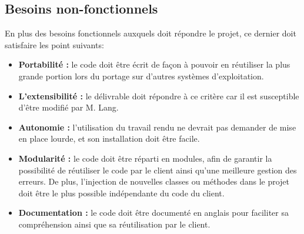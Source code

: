 \subsection{Besoins non-fonctionnels}
En plus des besoins fonctionnels auxquels doit répondre le projet, ce dernier doit satisfaire les point suivants:\\
\begin{itemize}
\item \textbf{Portabilité :} le code doit être écrit de façon à pouvoir en réutiliser la plus grande portion lors du portage sur d'autres systèmes d'exploitation.\\
\item \textbf{L'extensibilité :} le délivrable doit répondre à ce critère car il est susceptible d'être modifié par M. Lang.\\
\item \textbf{Autonomie :} l'utilisation du travail rendu ne devrait pas demander de mise en place lourde, et son installation doit être facile.\\
\item \textbf{Modularité :} le code doit être réparti en modules, afin de garantir la possibilité de réutiliser le code par le client ainsi qu'une meilleure gestion des erreurs. De plus, l'injection de nouvelles classes ou méthodes dans le projet doit être le plus possible indépendante du code du client.\\
\item \textbf{Documentation :} le code doit être documenté en anglais pour faciliter sa compréhension ainsi que sa réutilisation par le client.\\

\end{itemize}

